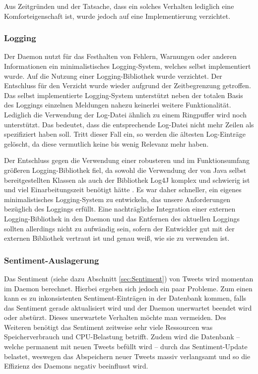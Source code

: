 Aus Zeitgründen und der Tatsache, dass ein solches Verhalten lediglich eine Komforteigenschaft ist, wurde jedoch auf eine Implementierung verzichtet.

\subsubsection{Logging}

Der Daemon nutzt für das Festhalten von Fehlern, Warnungen oder anderen Informationen ein minimalistisches Logging-System, welches selbst implementiert wurde.
Auf die Nutzung einer Logging-Bibliothek wurde verzichtet.
Der Entschluss für den Verzicht wurde wieder aufgrund der Zeitbegrenzung getroffen.
Das selbst implementierte Logging-System unterstützt neben der totalen Basis des Loggings einzelnen Meldungen nahezu keinerlei weitere Funktionalität.
Lediglich die Verwendung der Log-Datei ähnlich zu einem Ringpuffer wird noch unterstützt.
Das bedeutet, dass die entsprechende Log-Datei nicht mehr Zeilen als spezifiziert haben soll.
Tritt dieser Fall ein, so werden die ältesten Log-Einträge gelöscht, da diese vermutlich keine bis wenig Relevanz mehr haben.

Der Entschluss gegen die Verwendung einer robusteren und im Funktionsumfang größeren Logging-Bibliothek fiel, da sowohl die Verwendung der von Java selbst bereitgestellten Klassen als auch der Bibliothek Log4J komplex und schwierig ist und viel Einarbeitungszeit benötigt hätte \cite{log4J}.
Es war daher schneller, ein eigenes minimalistisches Logging-System zu entwickeln, das unsere Anforderungen bezüglich des Loggings erfüllt.
Eine nachträgliche Integration einer externen Logging-Bibliothek in den Daemon und das Entfernen des aktuellen Loggings sollten allerdings nicht zu aufwändig sein, sofern der Entwickler gut mit der externen Bibliothek vertraut ist und genau weiß, wie sie zu verwenden ist.

\subsubsection{Sentiment-Auslagerung}

Das Sentiment (siehe dazu Abschnitt \ref{sec:Sentiment}) von Tweets wird momentan im Daemon berechnet.
Hierbei ergeben sich jedoch ein paar Probleme.
Zum einen kann es zu inkonsistenten Sentiment-Einträgen in der Datenbank kommen, falls das Sentiment gerade aktualisiert wird und der Daemon unerwartet beendet wird oder abstürzt.
Dieses unerwartete Verhalten möchte man vermeiden.
Des Weiteren benötigt das Sentiment zeitweise sehr viele Ressourcen was Speicherverbrauch und CPU-Belastung betrifft.
Zudem wird die Datenbank -- welche permanent mit neuen Tweets befüllt wird -- durch das Sentiment-Update belastet, weswegen das Abspeichern neuer Tweets massiv verlangsamt und so die Effizienz des Daemons negativ beeinflusst wird.

